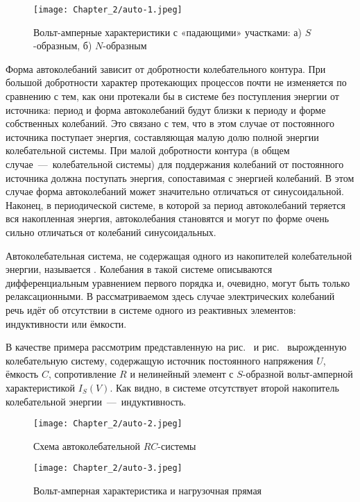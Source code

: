 \begin{figure}
	\centering
	\texttt{[image: Chapter\_2/auto-1.jpeg]}
	\caption{Вольт-амперные характеристики с «падающими» участками:	а)
$S$-образным, б) $N$-образным}
\end{figure}

Форма автоколебаний зависит от добротности колебательного контура. При большой
добротности характер протекающих процессов почти не изменяется по сравнению с
тем, как они протекали бы в системе без поступления
энергии от источника: период и форма автоколебаний будут близки к периоду и
форме собственных колебаний. Это связано с тем, что в этом случае от постоянного
источника поступает энергия, составляющая малую
долю полной энергии колебательной системы. При малой добротности контура (в
общем случае~---~колебательной системы) для поддержания колебаний от постоянного
источника должна поступать энергия, сопоставимая с энергией колебаний. В этом
случае форма автоколебаний может значительно отличаться от синусоидальной.
Наконец, в периодической системе, в которой за период автоколебаний теряется вся
накопленная энергия, автоколебания становятся  и
могут по форме очень сильно отличаться от колебаний синусоидальных.

Автоколебательная система, не содержащая одного из накопителей колебательной
энергии, называется . Колебания в такой системе
описываются дифференциальным уравнением первого порядка и, очевидно, могут быть
только релаксационными. В рассматриваемом здесь случае электрических колебаний
речь идёт об отсутствии в системе одного из реактивных элементов: индуктивности
или ёмкости.

В качестве примера рассмотрим представленную на рис.~ и
рис.~ вырожденную колебательную систему, содержащую источник
постоянного напряжения $U$, ёмкость $C$, сопротивление $R$ и нелинейный элемент
с $S$-образной вольт-амперной характеристикой $I_S(V)$. Как видно, в системе
отсутствует второй накопитель колебательной энергии~---~индуктивность.

\begin{figure}
	\centering
	\texttt{[image: Chapter\_2/auto-2.jpeg]}
	\caption{Схема автоколебательной $RC$-системы}
\end{figure}

\begin{figure}
	\centering
	\texttt{[image: Chapter\_2/auto-3.jpeg]}
	\caption{Вольт-амперная характеристика и нагрузочная прямая}
\end{figure}

